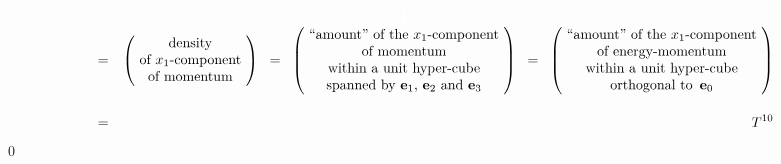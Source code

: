 \begin{eqnarray*}
&=&
	\left(\!
		\begin{array}{c}
		\textnormal{density}
		\\
		\textnormal{of $x_{1}$-component}
		\\
		\textnormal{of momentum}
		\end{array}
		\!\right)
\;\; = \;\;
	\overset{{\color{white}\textnormal{\LARGE1}}}{
		\left(\!
			\begin{array}{c}
			\textnormal{``amount'' of the $x_{1}$-component}
			\\
			\textnormal{of momentum}
			\\
			\textnormal{within a unit hyper-cube}
			\\
			\textnormal{spanned by $\mathbf{e}_{1}$, $\mathbf{e}_{2}$ and $\mathbf{e}_{3}$}
			\end{array}
			\!\right)
		}
\;\; = \;\;
	\left(\!
		\begin{array}{c}
		\textnormal{``amount'' of the $x_{1}$-component}
		\\
		\textnormal{of energy-momentum}
		\\
		\textnormal{within a unit hyper-cube}
		\\
		\textnormal{orthogonal to \,$\mathbf{e}_{0}$}
		\end{array}
		\!\right)
\\
&=&
	\overset{{\color{white}\textnormal{\large1}}}{
		T^{10}
		}
\end{eqnarray*}
\qed



